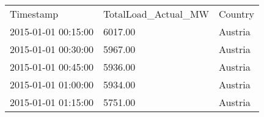 \begin{tabular}{lll}
Timestamp & TotalLoad\_Actual\_MW & Country \\
2015-01-01 00:15:00 & 6017.00 & Austria \\
2015-01-01 00:30:00 & 5967.00 & Austria \\
2015-01-01 00:45:00 & 5936.00 & Austria \\
2015-01-01 01:00:00 & 5934.00 & Austria \\
2015-01-01 01:15:00 & 5751.00 & Austria \\
\end{tabular}

